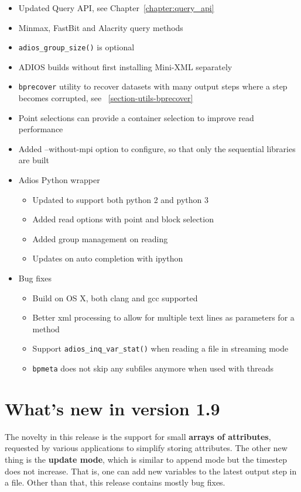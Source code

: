 \begin{itemize}
\item Updated Query API, see Chapter~\ref{chapter:query_api}
\item Minmax, FastBit and Alacrity query methods
\item \verb+adios_group_size()+ is optional
\item ADIOS builds without first installing Mini-XML separately
\item \verb+bprecover+ utility to recover datasets with many output steps where a step becomes corrupted, see ~\ref{section-utils-bprecover}
\item Point selections can provide a container selection to improve read performance
\item Added --without-mpi option to configure, so that only the sequential libraries are built
\item Adios Python wrapper
    \begin{itemize}
    \item Updated to support both python 2 and python 3
    \item Added read options with point and block selection
    \item Added group management on reading
    \item Updates on auto completion with ipython
    \end{itemize}

\item Bug fixes
    \begin{itemize}
    \item Build on OS X, both clang and gcc supported
    \item Better xml processing to allow for multiple text lines as parameters for a method
    \item Support \verb+adios_inq_var_stat()+ when reading a file in streaming mode
    \item \verb+bpmeta+ does not skip any subfiles anymore when used with threads
    \end{itemize}
\end{itemize}


\section {What's new in version 1.9}
The novelty in this release is the support for small {\bf arrays of attributes}, requested by various applications to simplify storing attributes. The other new thing is the {\bf update mode}, which is similar to append mode but the timestep does not increase. That is, one can add new variables to the latest output step in a file. Other than that, this release contains mostly bug fixes. 

